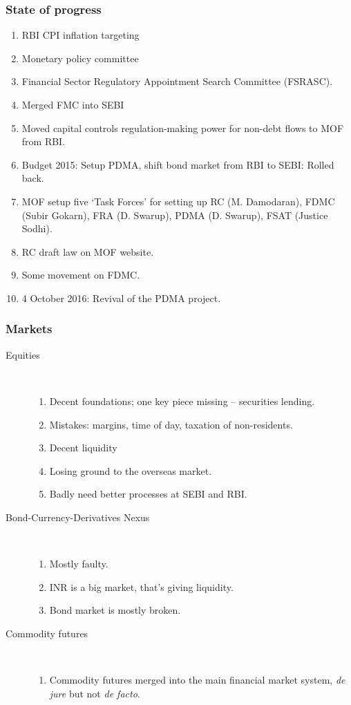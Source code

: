 \documentclass{beamer}
\begin{document}
\begin{frame}
  \frametitle{State of progress}
  \begin{enumerate}
  \item RBI CPI inflation targeting
  \item Monetary policy committee
  \item Financial Sector Regulatory Appointment Search Committee (FSRASC).
  \item Merged FMC into SEBI
  \item Moved capital controls regulation-making power for non-debt
    flows to MOF from RBI.
  \item Budget 2015: Setup PDMA, shift bond market from RBI to SEBI:
    Rolled back.
  \item MOF setup five `Task Forces' for setting up RC (M. Damodaran), FDMC
    (Subir Gokarn), FRA (D. Swarup), PDMA (D. Swarup), FSAT (Justice
    Sodhi).
  \item RC draft law on MOF website.
  \item Some movement on FDMC.
  \item 4 October 2016: Revival of the PDMA project.
  \end{enumerate}
\end{frame}

\begin{frame}
  \frametitle{Markets}
  \begin{description}
  \item[Equities] ~\\
    \begin{enumerate}
    \item Decent foundations; one key piece missing -- securities
      lending.
    \item Mistakes: margins, time of day, taxation of
      non-residents. 
    \item Decent liquidity
    \item Losing ground to the overseas market.
    \item Badly need better processes at SEBI and RBI.
    \end{enumerate}
  \item[Bond-Currency-Derivatives Nexus] ~\\
    \begin{enumerate}
    \item Mostly faulty.
    \item INR is a big market, that's giving liquidity.
    \item Bond market is mostly broken.
    \end{enumerate}
  \item[Commodity futures] ~\\
    \begin{enumerate}
    \item Commodity futures merged into the main financial market
      system, \textit{de jure} but not \textit{de facto}.
    \end{enumerate}
  \end{description}
\end{frame}
\end{document}
